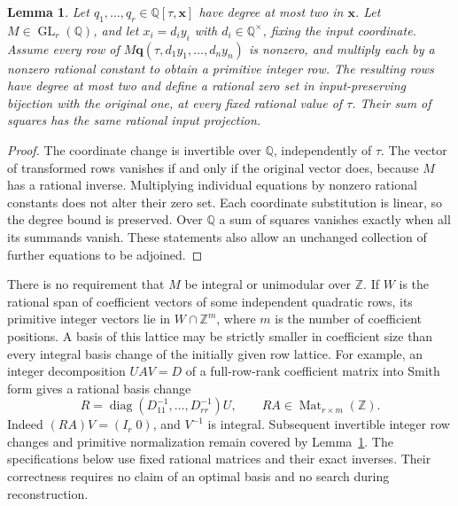 \documentclass[11pt,a4paper]{article}
\newtheorem{lemma}[theorem]{Lemma}
\newcommand{\Q}{\mathbb Q}\newcommand{\Z}{\mathbb Z}
\DeclareMathOperator{\GL}{GL}
\begin{document}
\begin{lemma}\label{lem:basis}
Let $q_1,\ldots,q_r\in\Q[\tau,\boldsymbol x]$ have degree at most two
in $\boldsymbol x$. Let $M\in\GL_r(\Q)$, and let
$x_i=d_i y_i$ with $d_i\in\Q^\times$, fixing the input coordinate.
Assume every row of $M\boldsymbol q(\tau,d_1y_1,\ldots,d_ny_n)$ is
nonzero, and multiply each by a nonzero rational constant to obtain a
primitive integer row. The resulting rows have degree at
most two and define a rational zero set in input-preserving bijection
with the original one, at every fixed rational value of $\tau$.
Their sum of squares has the same rational input projection.
\end{lemma}
\begin{proof}
The coordinate change is invertible over $\Q$, independently of
$\tau$. The vector of transformed rows vanishes if and only if the
original vector does, because $M$ has a rational inverse. Multiplying
individual equations by nonzero rational constants does not alter their
zero set. Each coordinate substitution is linear, so the degree bound
is preserved. Over $\Q$ a sum of squares vanishes exactly when all its
summands vanish. These statements also allow an unchanged collection
of further equations to be adjoined.
\end{proof}

There is no requirement that $M$ be integral or unimodular over $\Z$.
If $W$ is the rational span of coefficient vectors of some independent
quadratic rows, its primitive integer vectors lie in
$W\cap\Z^m$, where $m$ is the number of coefficient positions.
A basis of this lattice may be strictly smaller in coefficient size
than every integral basis change of the initially given row lattice.
For example, an integer decomposition $UAV=D$ of a full-row-rank
coefficient matrix into Smith form gives a rational basis change
\[
 R=\operatorname{diag}(D_{11}^{-1},\ldots,D_{rr}^{-1})U,
 \qquad RA\in\operatorname{Mat}_{r\times m}(\Z).
\]
Indeed $(RA)V=(I_r\;0)$, and $V^{-1}$ is integral. Subsequent invertible
integer row changes and primitive normalization remain covered by
Lemma~\ref{lem:basis}. The specifications below use fixed rational
matrices and their exact inverses. Their correctness requires no claim
of an optimal basis and no search during reconstruction.
\end{document}

